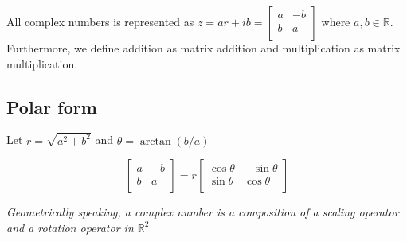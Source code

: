 \documentclass{article}
\begin{document}
All complex numbers is represented as $z = ar + ib = \begin{bmatrix}
    a & -b \\
    b & a \\
\end{bmatrix}$ where $a, b \in \mathbb{R}$. Furthermore, we define addition as matrix addition and multiplication as matrix multiplication.

\subsection{Polar form}

Let $r = \sqrt{a^2 + b^2}$ and $\theta = \arctan (b/a)$

$$
\begin{bmatrix}
    a & -b \\
    b & a \\
\end{bmatrix} = r \begin{bmatrix}
    \cos \theta & -\sin \theta \\
    \sin \theta & \cos \theta \\
\end{bmatrix}
$$

\emph{Geometrically speaking, a complex number is a composition of a scaling operator and a rotation operator in $\mathbb{R}^2$}
\end{document}
